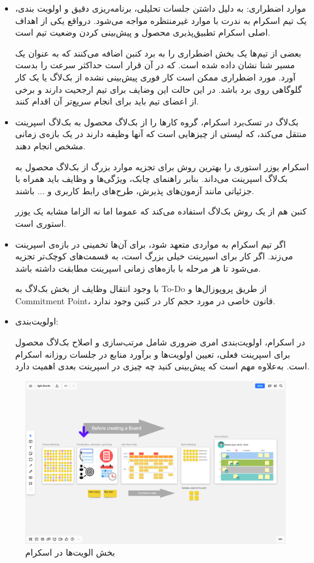 {\begin{itemize}
\item موارد اضطراری:
به دلیل داشتن جلسات تحلیلی، برنامه‌ریزی دقیق و اولویت بندی، یک تیم اسکرام به ندرت با موارد غیرمنتظره مواجه می‌شود. درواقع یکی از اهداف اصلی اسکرام تطبیق‌پذیری محصول و پیش‌بینی کردن وضعیت تیم است.

بعضی از تیم‌ها یک بخش اضطراری را به برد کنبن اضافه می‌کنند که به عنوان یک مسیر شنا نشان داده شده است. که در آن قرار است حداکثر سرعت را بدست آورد. مورد اضطراری ممکن است کار فوری پیش‌بینی نشده از بک‌لاگ یا یک کار گلوگاهی روی برد باشد. در این حالت این وضایف برای تیم ارجحیت دارند و برخی از اعضای تیم باید برای انجام سریع‌تر آن اقدام کنند.

\item بک‌لاگ
در تسک‌برد اسکرام، گروه کار‌ها را از بک‌لاگ محصول به بک‌لاگ اسپرینت منتقل می‌کند، که لیستی از چیزهایی است که آنها وظیفه دارند در یک بازه‌ی زمانی مشخص انجام دهند.

اسکرام یوزر استوری را بهترین روش برای تجزیه موارد بزرگ از بک‌لاگ محصول به بک‌لاگ اسپرینت می‌داند. بنابر راهنمای چابک، ویژگی‌ها و وظایف باید همراه با جزئیاتی مانند آزمون‌های پذیرش، طرح‌های رابط کاربری و ... باشند.

کنبن هم از یک روش بک‌لاگ استفاده می‌کند که عموما اما نه الزاما مشابه یک یوزر استوری است.

\item اگر تیم اسکرام به مواردی متعهد شود، برای آن‌ها تخمینی در بازه‌ی اسپرینت می‌زند. اگر کار برای اسپرینت خیلی بزرگ است، به قسمت‌های کوچک‌تر تجزیه می‌شود تا هر مرحله با بازه‌های زمانی اسپرینت مطابقت داشته باشد.

با وجود انتقال وظایف از بخش بک‌لاگ به To-Do از طریق پروپوزال‌ها و Commitment Point، قانون خاصی در مورد حجم کار در کنبن وجود ندارد.

\item اولویت‌بندی:

در اسکرام، اولویت‌بندی امری ضروری شامل مرتب‌سازی و اصلاح بک‌لاگ محصول برای اسپرینت فعلی، تعیین اولویت‌ها و برآورد منابع در جلسات روزانه اسکرام است. به‌علاوه مهم است که پیش‌بینی کنید چه چیزی در اسپرینت بعدی اهمیت دارد.
\end{itemize}
    
\begin{figure}
	\centering
	\includegraphics[scale=0.3]{figs/4-2-c}
	\caption{بخش الویت‌ها در اسکرام}
\end{figure}

}
